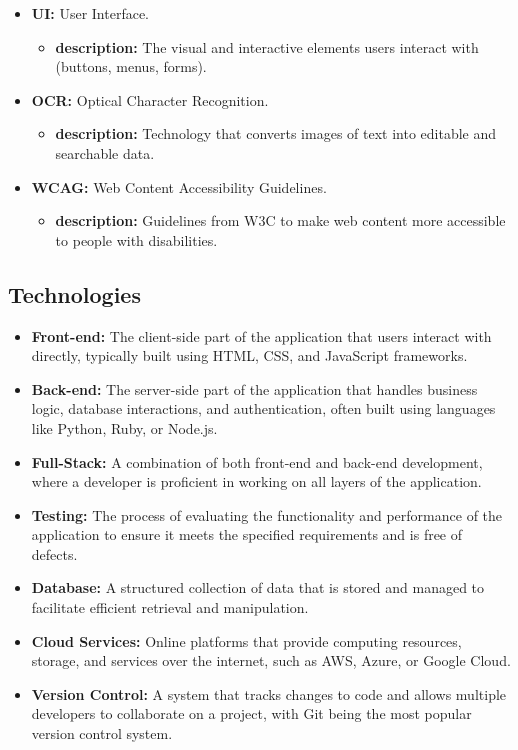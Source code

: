 \documentclass[12pt]{article}
\begin{document}
\begin{itemize}
\begin{itemize}[label=$\circ$]
        \end{itemize}
      \item \textbf{UI:} User Interface.
        \begin{itemize}[label=$\circ$]
          \item \textbf{description:} The visual and interactive elements users interact with (buttons, menus, forms).
        \end{itemize}
      \item \textbf{OCR:} Optical Character Recognition.
        \begin{itemize}[label=$\circ$]
          \item \textbf{description:} Technology that converts images of text into editable and searchable data.
        \end{itemize}
      \item \textbf{WCAG:} Web Content Accessibility Guidelines.
        \begin{itemize}[label=$\circ$]
          \item \textbf{description:} Guidelines from W3C to make web content more accessible to people with disabilities.
        \end{itemize}
    \end{itemize}

  \subsection{Technologies}
    \begin{itemize}
      \item \textbf{Front-end:} The client-side part of the application that users interact with directly, typically built using HTML, CSS, and JavaScript frameworks.
      \item \textbf{Back-end:} The server-side part of the application that handles business logic, database interactions, and authentication, often built using languages like Python, Ruby, or Node.js.
      \item \textbf{Full-Stack:} A combination of both front-end and back-end development, where a developer is proficient in working on all layers of the application.
      \item \textbf{Testing:} The process of evaluating the functionality and performance of the application to ensure it meets the specified requirements and is free of defects.
      \item \textbf{Database:} A structured collection of data that is stored and managed to facilitate efficient retrieval and manipulation.
      \item \textbf{Cloud Services:} Online platforms that provide computing resources, storage, and services over the internet, such as AWS, Azure, or Google Cloud.
      \item \textbf{Version Control:} A system that tracks changes to code and allows multiple developers to collaborate on a project, with Git being the most popular version control system.
    \end{itemize}
\end{document}

